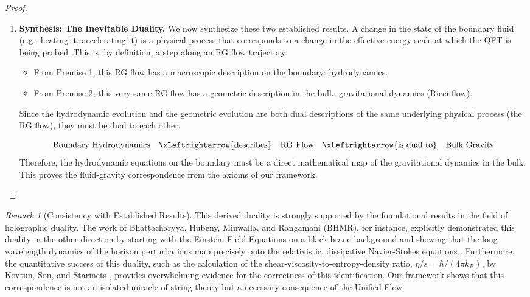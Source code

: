 \documentclass[11pt, letterpaper]{report}
\theoremstyle{plain} %
\theoremstyle{definition} %
\theoremstyle{remark} %
\newtheorem{remark}{Remark}[chapter]
\begin{document}
\begin{proof}
\begin{enumerate}
    \item \textbf{Synthesis: The Inevitable Duality.}
    We now synthesize these two established results. A change in the state of the boundary fluid (e.g., heating it, accelerating it) is a physical process that corresponds to a change in the effective energy scale at which the QFT is being probed. This is, by definition, a step along an RG flow trajectory.
    \begin{itemize}
        \item From Premise 1, this RG flow has a macroscopic description on the boundary: hydrodynamics.
        \item From Premise 2, this very same RG flow has a geometric description in the bulk: gravitational dynamics (Ricci flow).
    \end{itemize}
    Since the hydrodynamic evolution and the geometric evolution are both dual descriptions of the same underlying physical process (the RG flow), they must be dual to each other.

    $$
    \text{Boundary Hydrodynamics} \quad \xLeftrightarrow{\text{describes}} \quad \text{RG Flow} \quad \xLeftrightarrow{\text{is dual to}} \quad \text{Bulk Gravity}
    $$
    Therefore, the hydrodynamic equations on the boundary must be a direct mathematical map of the gravitational dynamics in the bulk. This proves the fluid-gravity correspondence from the axioms of our framework.
\end{enumerate}
\end{proof}
\begin{remark}[Consistency with Established Results]
This derived duality is strongly supported by the foundational results in the field of holographic duality. The work of Bhattacharyya, Hubeny, Minwalla, and Rangamani (BHMR), for instance, explicitly demonstrated this duality in the other direction by starting with the Einstein Field Equations on a black brane background and showing that the long-wavelength dynamics of the horizon perturbations map precisely onto the relativistic, dissipative Navier-Stokes equations \cite{Bhattacharyya2008NonlinearFluid}. Furthermore, the quantitative success of this duality, such as the calculation of the shear-viscosity-to-entropy-density ratio, $\eta/s = \hbar/(4\pi k_B)$, by Kovtun, Son, and Starinets \cite{Kovtun2005Viscosity}, provides overwhelming evidence for the correctness of this identification. Our framework shows that this correspondence is not an isolated miracle of string theory but a necessary consequence of the Unified Flow.
\end{remark}
\end{document}
